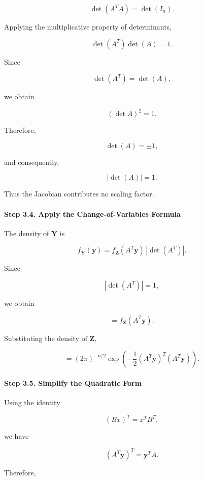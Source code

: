 \documentclass[11pt]{article}
\begin{document}
\begin{mdframed}[
		linewidth=0.8pt,
		roundcorner=6pt,
		backgroundcolor=gray!5,
		linecolor=gray!60,
		innertopmargin=10pt,
		innerbottommargin=10pt,
		innerleftmargin=10pt,
		innerrightmargin=10pt
		]
		\[
		\det(A^TA)
		=
		\det(I_n).
		\]
		
		Applying the multiplicative property of determinants,
		
		\[
		\det(A^T)\det(A)=1.
		\]
		
		Since
		
		\[
		\det(A^T)=\det(A),
		\]
		
		we obtain
		
		\[
		(\det A)^2=1.
		\]
		
		Therefore,
		
		\[
		\det(A)=\pm1,
		\]
		
		and consequently,
		
		\[
		\boxed{
			|\det(A)|=1.
		}
		\]
		
		Thus the Jacobian contributes no scaling factor.
		
		\vspace{0.3cm}
		
		\paragraph{Step 3.4. Apply the Change-of-Variables Formula}
		
		The density of $\mathbf Y$ is
		
		\[
		f_{\mathbf Y}(\mathbf y)
		=
		f_{\mathbf Z}(A^T\mathbf y)
		\,
		|\det(A^T)|.
		\]
		
		Since
		
		\[
		|\det(A^T)|=1,
		\]
		
		we obtain
		
		\[
		=
		f_{\mathbf Z}(A^T\mathbf y).
		\]
		
		Substituting the density of $\mathbf Z$,
		
		\[
		=
		(2\pi)^{-n/2}
		\exp
		\left(
		-\frac12
		(A^T\mathbf y)^T
		(A^T\mathbf y)
		\right).
		\]
		
		\vspace{0.3cm}
		
		\paragraph{Step 3.5. Simplify the Quadratic Form}
		
		Using the identity
		
		\[
		(Bx)^T=x^TB^T,
		\]
		
		we have
		
		\[
		(A^T\mathbf y)^T
		=
		\mathbf y^TA.
		\]
		
		Therefore,
		

\end{mdframed}
\end{document}
